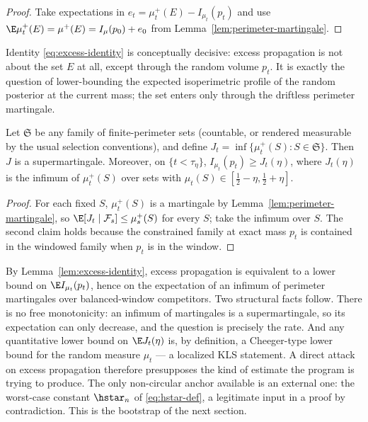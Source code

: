 \documentclass[../../main.tex]{subfiles}
\begin{document}
\begin{proof}
Take expectations in $e_t=\mu_t^+(E)-I_{\mu_t}(p_t)$ and use
$\E\mu_t^+(E)=\mu^+(E)=I_\mu(p_0)+e_0$ from Lemma~\ref{lem:perimeter-martingale}.
\end{proof}

Identity \eqref{eq:excess-identity} is conceptually decisive: excess propagation is not about
the set $E$ at all, except through the random volume $p_t$. It is exactly the question of
lower-bounding the expected isoperimetric profile of the random posterior at the current mass;
the set enters only through the driftless perimeter martingale.

\begin{lemma}
\label{lem:inf-martingales}
Let $\mathfrak S$ be any family of finite-perimeter sets (countable, or rendered measurable by
the usual selection conventions), and define $J_t=\inf\{\mu_t^+(S):S\in\mathfrak S\}$. Then
$J$ is a supermartingale. Moreover, on $\{t<\tau_\eta\}$,
$I_{\mu_t}(p_t)\ge J_t(\eta)$, where $J_t(\eta)$ is the infimum of $\mu_t^+(S)$ over sets with
$\mu_t(S)\in[\tfrac12-\eta,\tfrac12+\eta]$.
\end{lemma}

\begin{proof}
For each fixed $S$, $\mu_t^+(S)$ is a martingale by Lemma~\ref{lem:perimeter-martingale}, so
$\E[J_t\mid\mathcal F_s]\le\mu_s^+(S)$ for every $S$; take the infimum over $S$. The second
claim holds because the constrained family at exact mass $p_t$ is contained in the windowed
family when $p_t$ is in the window.
\end{proof}

\begin{remark}
\label{rem:circularity}
By Lemma~\ref{lem:excess-identity}, excess propagation is equivalent to a lower bound on
$\E I_{\mu_t}(p_t)$, hence on the expectation of an infimum of perimeter martingales over
balanced-window competitors. Two structural facts follow. There is no free monotonicity: an
infimum of martingales is a supermartingale, so its expectation can only decrease, and the
question is precisely the rate. And any quantitative lower bound on $\E J_t(\eta)$ is, by
definition, a Cheeger-type lower bound for the random measure $\mu_t$ --- a localized KLS
statement. A direct attack on excess propagation therefore presupposes the kind of estimate the
program is trying to produce. The only non-circular anchor available is an external one: the
worst-case constant $\hstar_n$ of \eqref{eq:hstar-def}, a legitimate input in a proof by
contradiction. This is the bootstrap of the next section.
\end{remark}
\end{document}
